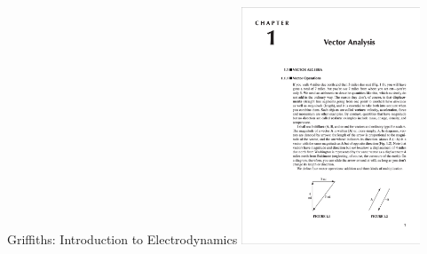 \documentclass{beamer}
\begin{document}
\begin{frame}[fragile]{Griffiths: Introduction to Electrodynamics}
  \includegraphics[frame,width=0.4\textwidth]{examples/griffiths}
\end{frame}
\end{document}
